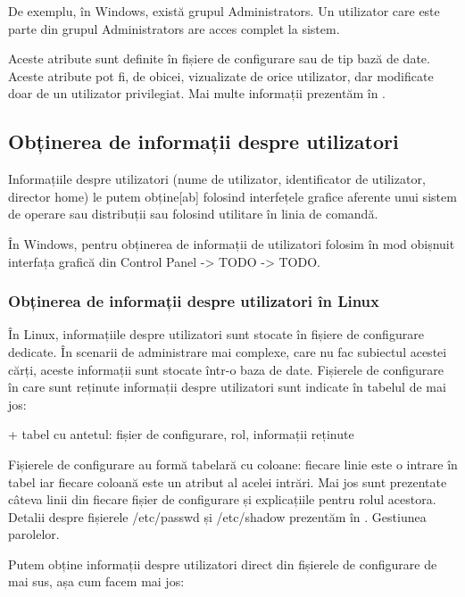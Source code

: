 De exemplu, în Windows, există grupul Administrators. Un utilizator care este
parte din grupul Administrators are acces complet la sistem.

Aceste atribute sunt definite în fișiere de configurare sau de tip bază de date.
Aceste atribute pot fi, de obicei, vizualizate de orice utilizator, dar
modificate doar de un utilizator privilegiat. Mai multe informații prezentăm în
.

\subsection{Obținerea de informații despre utilizatori}
\label{sec:users-ops-info}

Informațiile despre utilizatori (nume de utilizator, identificator de
utilizator, director home) le putem obține[ab] folosind interfețele grafice
aferente unui sistem de operare sau distribuții sau folosind utilitare în linia
de comandă.

În Windows, pentru obținerea de informații de utilizatori folosim în mod
obișnuit interfața grafică din Control Panel -> TODO -> TODO.

\subsubsection{Obținerea de informații despre utilizatori în Linux}
\label{sec:users-ops-info-linux}

În Linux, informațiile despre utilizatori sunt stocate în fișiere de configurare
dedicate. În scenarii de administrare mai complexe, care nu fac subiectul
acestei cărți, aceste informații sunt stocate într-o baza de date. Fișierele de
configurare în care sunt reținute informații despre utilizatori sunt indicate în
tabelul de mai jos:

+ tabel cu antetul: fișier de configurare, rol, informații reținute

Fișierele de configurare au formă tabelară cu coloane: fiecare linie este o
intrare în tabel iar fiecare coloană este un atribut al acelei intrări. Mai jos
sunt prezentate câteva linii din fiecare fișier de configurare și explicațiile
pentru rolul acestora. Detalii despre fișierele /etc/passwd și /etc/shadow
prezentăm în . Gestiunea
parolelor.

Putem obține informații despre utilizatori direct din fișierele de configurare
de mai sus, așa cum facem mai jos:

